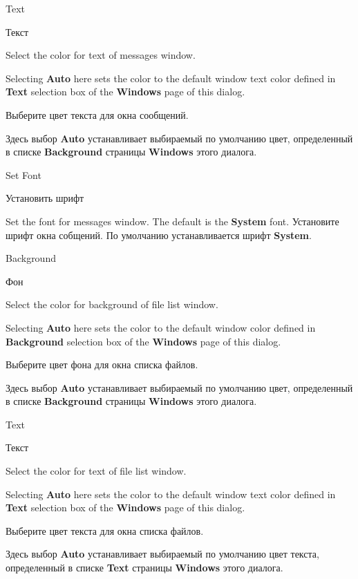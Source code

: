 \begin{popup}
\ifenglish
\caption{Text}
\else
\caption{Текст}
\fi
{}

\ifenglish
Select the color for text of messages window.

Selecting {\bf Auto} here sets the color to the default window text color
defined in {\bf Text} selection box of the {\bf Windows} page of this
dialog.

\else
Выберите цвет текста для окна сообщений.

Здесь выбор {\bf Auto} устанавливает выбираемый по умолчанию цвет,
определенный в списке {\bf Background} страницы {\bf Windows} этого диалога.
\fi
\end{popup}

\begin{popup}
\ifenglish
\caption{Set Font}
\else
\caption{Установить шрифт}
\fi
{}
\ifenglish
Set the font for messages window. The default is the {\bf System} font.
\else
Установите шрифт окна собщений. По умолчанию устанавливается шрифт {\bf System}.
\fi
\end{popup}


\begin{popup}
\ifenglish
\caption{Background}
\else
\caption{Фон}
\fi
{}
\ifenglish
Select the color for background of file list window.

Selecting {\bf Auto} here sets the color to the default window color
defined in {\bf Background} selection box of the {\bf Windows} page of this
dialog.

\else
Выберите цвет фона для окна списка файлов.

Здесь выбор {\bf Auto} устанавливает выбираемый по умолчанию цвет,
определенный в списке {\bf Background} страницы {\bf Windows} этого диалога.
\fi
\end{popup}

\begin{popup}
\ifenglish
\caption{Text}
\else
\caption{Текст}
\fi
{}
\ifenglish
Select the color for text of file list window.

Selecting {\bf Auto} here sets the color to the default window text color
defined in {\bf Text} selection box of the {\bf Windows} page of this
dialog.
\else

Выберите цвет текста для окна списка файлов.

Здесь выбор {\bf Auto} устанавливает выбираемый по умолчанию цвет текста,
определенный в списке {\bf Text} страницы {\bf Windows} этого диалога.
\fi
\end{popup}

